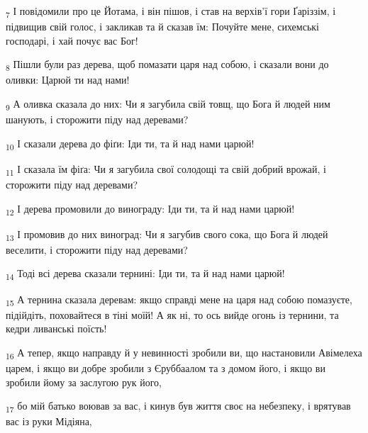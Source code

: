 \begin{tcolorbox}
\textsubscript{7} І повідомили про це Йотама, і він пішов, і став на верхів'ї гори Ґаріззім, і підвищив свій голос, і закликав та й сказав їм: Почуйте мене, сихемські господарі, і хай почує вас Бог!
\end{tcolorbox}
\begin{tcolorbox}
\textsubscript{8} Пішли були раз дерева, щоб помазати царя над собою, і сказали вони до оливки: Царюй ти над нами!
\end{tcolorbox}
\begin{tcolorbox}
\textsubscript{9} А оливка сказала до них: Чи я загубила свій товщ, що Бога й людей ним шанують, і сторожити піду над деревами?
\end{tcolorbox}
\begin{tcolorbox}
\textsubscript{10} І сказали дерева до фіґи: Іди ти, та й над нами царюй!
\end{tcolorbox}
\begin{tcolorbox}
\textsubscript{11} І сказала їм фіґа: Чи я загубила свої солодощі та свій добрий врожай, і сторожити піду над деревами?
\end{tcolorbox}
\begin{tcolorbox}
\textsubscript{12} І дерева промовили до винограду: Іди ти, та й над нами царюй!
\end{tcolorbox}
\begin{tcolorbox}
\textsubscript{13} І промовив до них виноград: Чи я загубив свого сока, що Бога й людей веселити, і сторожити піду над деревами?
\end{tcolorbox}
\begin{tcolorbox}
\textsubscript{14} Тоді всі дерева сказали тернині: Іди ти, та й над нами царюй!
\end{tcolorbox}
\begin{tcolorbox}
\textsubscript{15} А тернина сказала деревам: якщо справді мене на царя над собою помазуєте, підійдіть, поховайтеся в тіні моїй! А як ні, то ось вийде огонь із тернини, та кедри ливанські поїсть!
\end{tcolorbox}
\begin{tcolorbox}
\textsubscript{16} А тепер, якщо направду й у невинності зробили ви, що настановили Авімелеха царем, і якщо ви добре зробили з Єруббаалом та з домом його, і якщо ви зробили йому за заслугою рук його,
\end{tcolorbox}
\begin{tcolorbox}
\textsubscript{17} бо мій батько воював за вас, і кинув був життя своє на небезпеку, і врятував вас із руки Мідіяна,
\end{tcolorbox}
